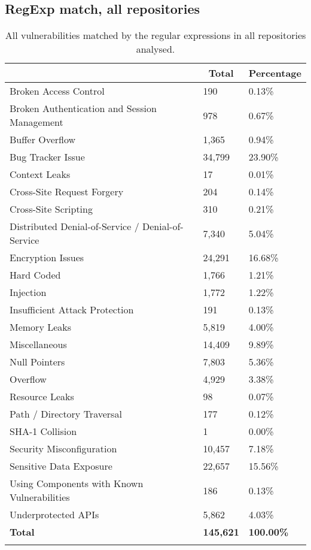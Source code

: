 \documentclass[acb16zje.tex]{subfiles}
\begin{document}
\subsection{RegExp match, all repositories}
\begin{longtable}{|l|l|l|}
  \hline \endfirsthead \rowcolor[HTML]{D8D8D8}
  \multicolumn{1}{|c|}{Vulnerabilities} & \multicolumn{1}{|c|}{Total} &
  \multicolumn{1}{|c|}{Percentage} \\ \hline
  Broken Access Control & 190 & 0.13\% \\
  Broken Authentication and Session Management & 978 & 0.67\% \\
  Buffer Overflow & 1,365 & 0.94\% \\
  Bug Tracker Issue & 34,799 & 23.90\% \\
  Context Leaks & 17 & 0.01\% \\
  Cross-Site Request Forgery & 204 & 0.14\% \\
  Cross-Site Scripting & 310 & 0.21\% \\
  Distributed Denial-of-Service / Denial-of-Service & 7,340 & 5.04\% \\
  Encryption Issues & 24,291 & 16.68\% \\
  Hard Coded & 1,766 & 1.21\% \\
  Injection & 1,772 & 1.22\% \\
  Insufficient Attack Protection & 191 & 0.13\% \\
  Memory Leaks & 5,819 & 4.00\% \\
  Miscellaneous & 14,409 & 9.89\% \\
  Null Pointers & 7,803 & 5.36\% \\
  Overflow & 4,929 & 3.38\% \\
  Resource Leaks & 98 & 0.07\% \\
  Path / Directory Traversal & 177 & 0.12\% \\
  SHA-1 Collision & 1 & 0.00\% \\
  Security Misconfiguration & 10,457 & 7.18\% \\
  Sensitive Data Exposure & 22,657 & 15.56\% \\
  Using Components with Known Vulnerabilities & 186 & 0.13\% \\
  Underprotected APIs & 5,862 & 4.03\% \\ \hline
  \textbf{Total} & \textbf{145,621} & \textbf{100.00\%} \\ \hline
  \caption{All vulnerabilities matched by the regular expressions in all repositories analysed.}
\end{longtable}
\end{document}
